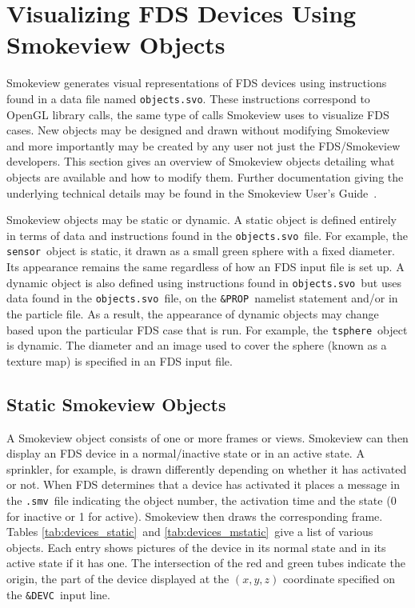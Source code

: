 %
%
\newcommand{\devicewidth}{1.5in}
\newcommand{\boxwidth}{2.75in}
\newcommand{\incgraphics}[1]{
\parbox[c]{\devicewidth}{
\vspace{0.01in}
\texttt{[image: \#1]}
\vspace{0.01in}
}
}

\section{Visualizing FDS Devices Using Smokeview Objects}
Smokeview generates visual representations of FDS devices using instructions found in a data file named 
{\tt objects.svo}.  These instructions correspond to OpenGL library calls, the same type of calls Smokeview 
uses to visualize FDS cases.  New objects may be designed and drawn without modifying Smokeview and more 
importantly may be created by any user not just the FDS/Smokeview developers.  This section gives an overview 
of Smokeview objects detailing what objects are available and how to modify them.  Further documentation 
giving the underlying technical details may be found in the Smokeview User's Guide~\cite{Smokeview_Users_Guide_5}.

Smokeview objects may be static or dynamic.  A static object is defined entirely in terms of data and instructions 
found in the {\tt objects.svo}\ file.  For example, the {\tt sensor}\ object is static, it drawn as a small green 
sphere with a fixed diameter.  Its appearance remains the same regardless of how an FDS input file is set 
up.  A dynamic object is also defined using instructions found in {\tt objects.svo}\ but uses data found in the 
{\tt objects.svo}\ file, on the {\tt \&PROP}\ namelist statement and/or in the particle file.  As a result, the 
appearance of dynamic objects may change based upon the particular FDS case that is run.   For example, the {\tt tsphere}\ 
object is dynamic.  The diameter and an image used to cover the sphere (known as a texture map) is specified in an FDS input file.


\subsection{Static Smokeview Objects}

A Smokeview object consists of one or more frames or views.  Smokeview can then display an FDS device in a 
normal/inactive state or in an active state.  A sprinkler, for example, is drawn differently depending on 
whether it has activated or not.  When FDS determines that a device has activated it places a message in the 
{\tt .smv}\ file indicating the object number, the activation time and the state (0 for inactive or 1 for active).
Smokeview then draws the corresponding frame.  Tables \ref{tab:devices_static}\ and \ref{tab:devices_mstatic}\
give a list of various objects.  Each entry shows pictures of the device in its normal state and 
in its active state if it has one.  The intersection of the red and green tubes indicate the origin, 
the part of the device displayed at the $(x,y,z)$ coordinate specified on the {\tt \&DEVC}\ input line.

